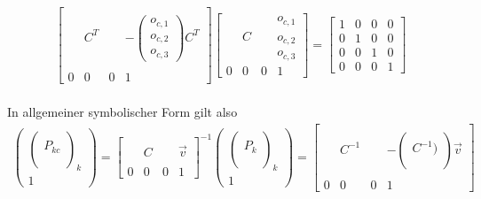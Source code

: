 \begin{gather}
\begin{bmatrix}
& & & \\
& C^T & & -\begin{pmatrix}
o_{c,1}\\
o_{c,2}\\
o_{c,3}
\end{pmatrix}C^T \\
& & & \\
0&0 &0 & 1
\end{bmatrix}
\begin{bmatrix}
& & & o_{c,1}\\
& C & & o_{c,2}\\
& & &o_{c,3} \\
0&0 &0 & 1
\end{bmatrix}
=
\begin{bmatrix}
1&0 &0 & 0\\
0& 1 &0 & 0\\
0& 0& 1& 0\\
0& 0 &0 & 1
\end{bmatrix}
\end{gather}\\

In allgemeiner symbolischer Form gilt also\\

\begin{gather}
\begin{pmatrix}
\begin{pmatrix}
\\
P_{kc}\\
\\
\end{pmatrix}_k\\
1
\end{pmatrix}
=
\begin{bmatrix}
&  &  & \\
&  C&  &\vec{v} \\ 
&  &  & \\
0&0&0 & 1
\end{bmatrix}^{-1}
\begin{pmatrix}
\begin{pmatrix}
\\
P_k\\
\\
\end{pmatrix}_k\\
1
\end{pmatrix}
=
\begin{bmatrix}
&  &  & \\
&  C^{-1}&  &-\begin{pmatrix}
\\
C^{-1})\\
\\
\end{pmatrix}\vec{v} \\ 
&  &  & \\
0&0&0 & 1
\end{bmatrix}
\end{gather}\\

